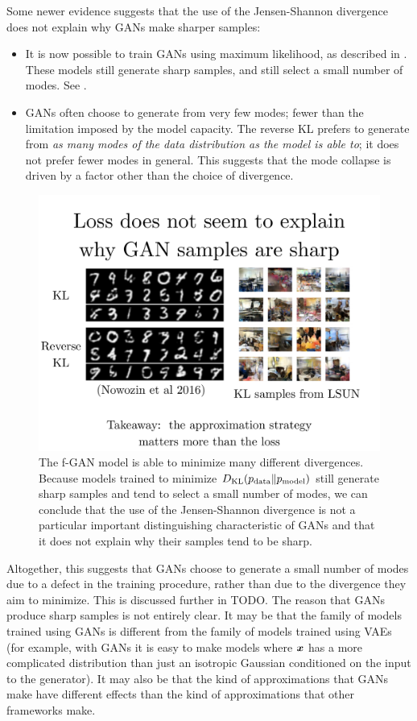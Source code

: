 Some newer evidence suggests that the use of the Jensen-Shannon divergence does
not explain why GANs make sharper samples:
\begin{itemize}
  \item It is now possible to train GANs using maximum likelihood, as described in
    .
    These models still generate sharp samples, and still select a small number of modes.
    See .
  \item
    GANs often choose to generate from very few modes; fewer than the limitation
    imposed by the model capacity.
    The reverse KL prefers to generate from {\em as many modes of the data distribution as the model is able to};
    it does not prefer fewer modes in general.
    This suggests that the mode collapse is driven by a factor other than the choice 
    of divergence.
\end{itemize}

\begin{figure}
\centering
\includegraphics[width=\figwidth]{fgan}
\caption{
The f-GAN model is able to minimize many different divergences.
Because models trained to minimize $D_{\mathrm{KL}}(p_{\rm{data}} \Vert p_{\rm{model}})$
still generate sharp samples and tend to select a small number
of modes, we can conclude that the use of the Jensen-Shannon
divergence is not a particular important distinguishing
characteristic of GANs and that it does not explain why their
samples tend to be sharp.
}
\label{fig:fgan}
\end{figure}

Altogether, this suggests that GANs choose to generate a small number of modes
due to a defect in the training procedure, rather than due to the divergence
they aim to minimize.
This is discussed further in TODO.
The reason that GANs produce sharp samples is not entirely clear.
It may be that the family of models trained using GANs is different from the family
of models trained using VAEs (for example, with GANs it is easy to make models
where ${\bm{x}}$ has a more complicated distribution than just an isotropic Gaussian
conditioned on the input to the generator).
It may also be that the kind of approximations that GANs make have different
effects than the kind of approximations that other frameworks make.

